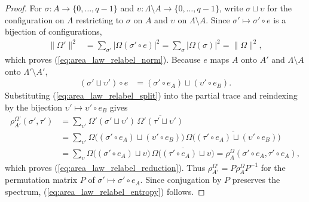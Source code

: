 \begin{proof}\leanok
    For $\sigma:A\to\{0,\ldots,q-1\}$ and
    $\upsilon:\Lambda\setminus A\to\{0,\ldots,q-1\}$, write $\sigma\sqcup\upsilon$
    for the configuration on $\Lambda$ restricting to $\sigma$ on $A$ and
    $\upsilon$ on $\Lambda\setminus A$.
    Since $\sigma'\mapsto\sigma'\circ e$ is a bijection of configurations,
    \begin{align}
        \|\Omega'\|^2 & =\sum_{\sigma'}|\Omega(\sigma'\circ e)|^2
        =\sum_\sigma|\Omega(\sigma)|^2=\|\Omega\|^2,
    \end{align}
    which proves (\ref{eq:area_law_relabel_norm}). Because $e$ maps $A$ onto $A'$ and
    $\Lambda\setminus A$ onto $\Lambda'\setminus A'$,
    \begin{align}
        (\sigma'\sqcup\upsilon')\circ e
         & =(\sigma'\circ e_A)\sqcup(\upsilon'\circ e_B).
        \label{eq:area_law_relabel_split}
    \end{align}
    Substituting (\ref{eq:area_law_relabel_split}) into the partial trace and
    reindexing by the bijection $\upsilon'\mapsto\upsilon'\circ e_B$ gives
    \begin{align}
        \rho_{A'}^{\Omega'}(\sigma',\tau')
         & =\sum_{\upsilon'}\Omega'(\sigma'\sqcup\upsilon')\,
        \overline{\Omega'(\tau'\sqcup\upsilon')}                                           \\
         & =\sum_{\upsilon'}\Omega\big((\sigma'\circ e_A)\sqcup(\upsilon'\circ e_B)\big)\,
        \overline{\Omega\big((\tau'\circ e_A)\sqcup(\upsilon'\circ e_B)\big)}              \\
         & =\sum_{\upsilon}\Omega\big((\sigma'\circ e_A)\sqcup\upsilon\big)\,
        \overline{\Omega\big((\tau'\circ e_A)\sqcup\upsilon\big)}
        =\rho_A^\Omega(\sigma'\circ e_A,\tau'\circ e_A),
    \end{align}
    which proves (\ref{eq:area_law_relabel_reduction}). Thus
    $\rho_{A'}^{\Omega'}=P\rho_A^\Omega P^{-1}$ for the permutation matrix $P$ of
    $\sigma'\mapsto\sigma'\circ e_A$. Since conjugation by $P$ preserves the
    spectrum, (\ref{eq:area_law_relabel_entropy}) follows.
\end{proof}
